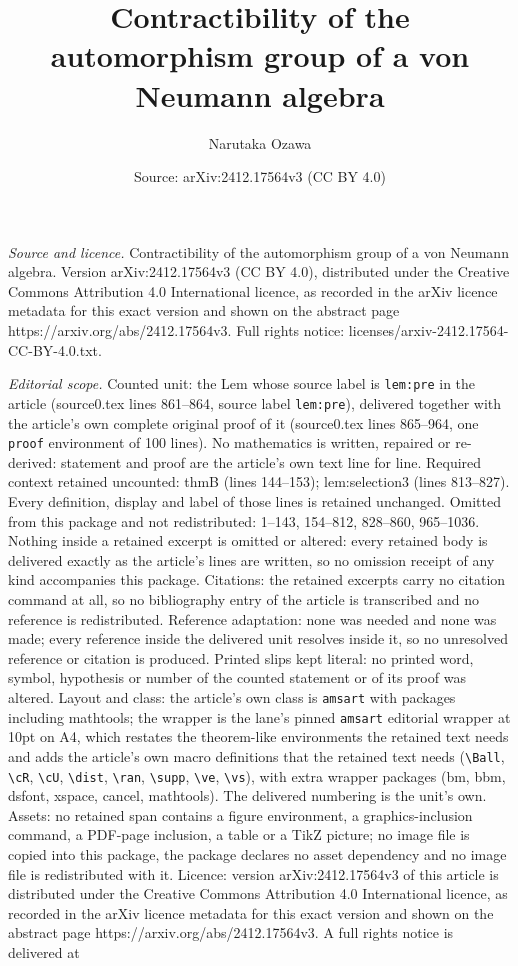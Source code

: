 \documentclass[10pt,a4paper]{amsart}
\title[Contractibility of the automorphism group of a von Neumann a]{Contractibility of the automorphism group of a von Neumann algebra}
\author{Narutaka Ozawa}
\date{Source: arXiv:2412.17564v3 (CC BY 4.0)}
\begin{document}
\maketitle

\noindent\emph{Source and licence.} Contractibility of the automorphism group of a von Neumann algebra. Version arXiv:2412.17564v3 (CC BY 4.0), distributed under the Creative Commons Attribution 4.0 International licence, as recorded in the arXiv licence metadata for this exact version and shown on the abstract page https://arxiv.org/abs/2412.17564v3. Full rights notice: licenses/arxiv-2412.17564-CC-BY-4.0.txt.\par\smallskip

\noindent\textit{Editorial scope.} Counted unit: the Lem whose source label is \texttt{lem:pre} in the article (source0.tex lines 861--864, source label \texttt{lem:pre}), delivered together with the article's own complete original proof of it (source0.tex lines 865--964, one \texttt{proof} environment of 100 lines). No mathematics is written, repaired or re-derived: statement and proof are the article's own text line for line. Required context retained uncounted: thmB (lines 144--153); lem:selection3 (lines 813--827). Every definition, display and label of those lines is retained unchanged. Omitted from this package and not redistributed: 1--143, 154--812, 828--860, 965--1036. Nothing inside a retained excerpt is omitted or altered: every retained body is delivered exactly as the article's lines are written, so no omission receipt of any kind accompanies this package. Citations: the retained excerpts carry no citation command at all, so no bibliography entry of the article is transcribed and no reference is redistributed. Reference adaptation: none was needed and none was made; every reference inside the delivered unit resolves inside it, so no unresolved reference or citation is produced. Printed slips kept literal: no printed word, symbol, hypothesis or number of the counted statement or of its proof was altered. Layout and class: the article's own class is \texttt{amsart} with packages including mathtools; the wrapper is the lane's pinned \texttt{amsart} editorial wrapper at 10pt on A4, which restates the theorem-like environments the retained text needs and adds the article's own macro definitions that the retained text needs (\texttt{\textbackslash Ball}, \texttt{\textbackslash cR}, \texttt{\textbackslash cU}, \texttt{\textbackslash dist}, \texttt{\textbackslash ran}, \texttt{\textbackslash supp}, \texttt{\textbackslash ve}, \texttt{\textbackslash vs}), with extra wrapper packages (bm, bbm, dsfont, xspace, cancel, mathtools). The delivered numbering is the unit's own. Assets: no retained span contains a figure environment, a graphics-inclusion command, a PDF-page inclusion, a table or a TikZ picture; no image file is copied into this package, the package declares no asset dependency and no image file is redistributed with it. Licence: version arXiv:2412.17564v3 of this article is distributed under the Creative Commons Attribution 4.0 International licence, as recorded in the arXiv licence metadata for this exact version and shown on the abstract page https://arxiv.org/abs/2412.17564v3. A full rights notice is delivered at 
\end{document}
